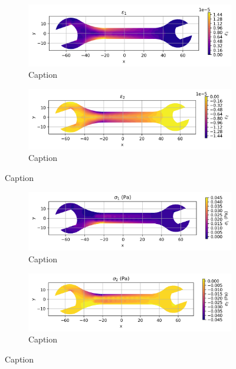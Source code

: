 \documentclass{article}  %
\begin{document}
\begin{figure}[H]
  \centering
  \begin{subfigure}[t]{0.49\textwidth}
    \centering
    \includegraphics[width=\textwidth]{GRAFICOS/Case d - epsilon_1.png}
    \caption{Caption}
    \label{fig:deformada_reacciones}
  \end{subfigure}
  \hfill
  \begin{subfigure}[t]{0.49\textwidth}
    \centering
    \includegraphics[width=\textwidth]{GRAFICOS/Case d - epsilon_2.png}
    \caption{Caption}
    \label{fig:von_mises}
  \end{subfigure}
  \caption{Caption}
  \label{fig:analisis_estructural}
\end{figure}

\begin{figure}[H]
  \centering
  \begin{subfigure}[t]{0.49\textwidth}
    \centering
    \includegraphics[width=\textwidth]{GRAFICOS/Case d - sigma_1.png}
    \caption{Caption}
    \label{fig:deformada_reacciones}
  \end{subfigure}
  \hfill
  \begin{subfigure}[t]{0.49\textwidth}
    \centering
    \includegraphics[width=\textwidth]{GRAFICOS/Case d - sigma_2.png}
    \caption{Caption}
    \label{fig:von_mises}
  \end{subfigure}
  \caption{Caption}
  \label{fig:analisis_estructural}
\end{figure}
\end{document}
